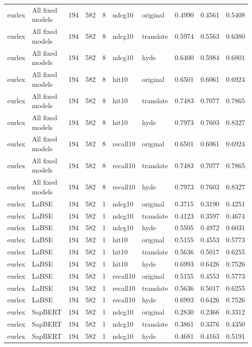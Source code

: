 \begin{tabular}{llrrrllrrr}
eurlex & All fixed models & 194 & 582 & 8 & ndcg10 & original & 0.4990 & 0.4561 & 0.5408 \\
eurlex & All fixed models & 194 & 582 & 8 & ndcg10 & translate & 0.5974 & 0.5563 & 0.6380 \\
eurlex & All fixed models & 194 & 582 & 8 & ndcg10 & hyde & 0.6400 & 0.5984 & 0.6801 \\
eurlex & All fixed models & 194 & 582 & 8 & hit10 & original & 0.6501 & 0.6061 & 0.6924 \\
eurlex & All fixed models & 194 & 582 & 8 & hit10 & translate & 0.7483 & 0.7077 & 0.7865 \\
eurlex & All fixed models & 194 & 582 & 8 & hit10 & hyde & 0.7973 & 0.7603 & 0.8327 \\
eurlex & All fixed models & 194 & 582 & 8 & recall10 & original & 0.6501 & 0.6061 & 0.6924 \\
eurlex & All fixed models & 194 & 582 & 8 & recall10 & translate & 0.7483 & 0.7077 & 0.7865 \\
eurlex & All fixed models & 194 & 582 & 8 & recall10 & hyde & 0.7973 & 0.7603 & 0.8327 \\
eurlex & LaBSE & 194 & 582 & 1 & ndcg10 & original & 0.3715 & 0.3190 & 0.4251 \\
eurlex & LaBSE & 194 & 582 & 1 & ndcg10 & translate & 0.4123 & 0.3597 & 0.4674 \\
eurlex & LaBSE & 194 & 582 & 1 & ndcg10 & hyde & 0.5505 & 0.4972 & 0.6031 \\
eurlex & LaBSE & 194 & 582 & 1 & hit10 & original & 0.5155 & 0.4553 & 0.5773 \\
eurlex & LaBSE & 194 & 582 & 1 & hit10 & translate & 0.5636 & 0.5017 & 0.6255 \\
eurlex & LaBSE & 194 & 582 & 1 & hit10 & hyde & 0.6993 & 0.6426 & 0.7526 \\
eurlex & LaBSE & 194 & 582 & 1 & recall10 & original & 0.5155 & 0.4553 & 0.5773 \\
eurlex & LaBSE & 194 & 582 & 1 & recall10 & translate & 0.5636 & 0.5017 & 0.6255 \\
eurlex & LaBSE & 194 & 582 & 1 & recall10 & hyde & 0.6993 & 0.6426 & 0.7526 \\
eurlex & SapBERT & 194 & 582 & 1 & ndcg10 & original & 0.2830 & 0.2366 & 0.3312 \\
eurlex & SapBERT & 194 & 582 & 1 & ndcg10 & translate & 0.3861 & 0.3376 & 0.4350 \\
eurlex & SapBERT & 194 & 582 & 1 & ndcg10 & hyde & 0.4681 & 0.4163 & 0.5191 \\

\end{tabular}
